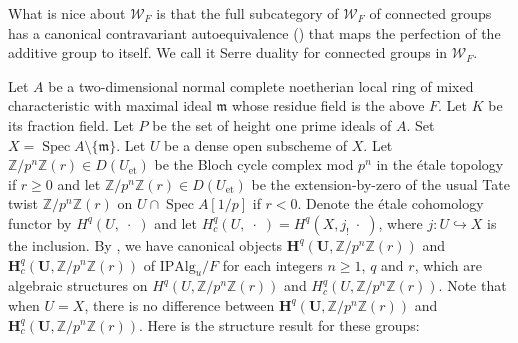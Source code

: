 \documentclass{amsart}
\theoremstyle{remark}
\numberwithin{equation}{section}
\newcommand{\into}{\hookrightarrow}
\newcommand{\Z}{\mathbb{Z}}
\newcommand{\et}{\mathrm{et}}
\newcommand{\Alg}{\mathrm{Alg}}
\newcommand{\Ind}{\mathrm{I}}
\newcommand{\Pro}{\mathrm{P}}
\newcommand{\alg}[1]{\mathbf{#1}}
\newcommand{\var}{\;\cdot\;}
\newcommand{\ideal}[1]{\mathfrak{#1}}
\DeclareMathOperator{\Spec}{Spec}
\begin{document}
What is nice about $\mathcal{W}_{F}$ is that
the full subcategory of $\mathcal{W}_{F}$ of connected groups
has a canonical contravariant autoequivalence (\cite[Proposition 3.1.7]{Suz24})
that maps the perfection of the additive group to itself.
We call it Serre duality for connected groups in $\mathcal{W}_{F}$.

Let $A$ be a two-dimensional normal complete noetherian local ring of mixed characteristic
with maximal ideal $\ideal{m}$ whose residue field is the above $F$.
Let $K$ be its fraction field.
Let $P$ be the set of height one prime ideals of $A$.
Set $X = \Spec A \setminus \{\ideal{m}\}$.
Let $U$ be a dense open subscheme of $X$.
Let $\Z / p^{n} \Z(r) \in D(U_{\et})$ be the Bloch cycle complex mod $p^{n}$
in the \'etale topology if $r \ge 0$
and let $\Z / p^{n} \Z(r) \in D(U_{\et})$ be the extension-by-zero of the usual Tate twist $\Z / p^{n} \Z(r)$
on $U \cap \Spec A[1 / p]$ if $r < 0$.
Denote the \'etale cohomology functor by $H^{q}(U, \var)$
and let $H^{q}_{c}(U, \var) = H^{q}(X, j_{!} \var)$,
where $j \colon U \into X$ is the inclusion.
By \cite[Theorem 1.3.1]{Suz24},
we have canonical objects
$\alg{H}^{q}(\alg{U}, \Z / p^{n} \Z(r))$
and $\alg{H}^{q}_{c}(\alg{U}, \Z / p^{n} \Z(r))$ of $\Ind \Pro \Alg_{u} / F$
for each integers $n \ge 1$, $q$ and $r$,
which are algebraic structures on $H^{q}(U, \Z / p^{n} \Z(r))$ and $H^{q}_{c}(U, \Z / p^{n} \Z(r))$.
Note that when $U = X$, there is no difference between
$\alg{H}^{q}(\alg{U}, \Z / p^{n} \Z(r))$
and $\alg{H}^{q}_{c}(\alg{U}, \Z / p^{n} \Z(r))$.
Here is the structure result for these groups:
\end{document}
